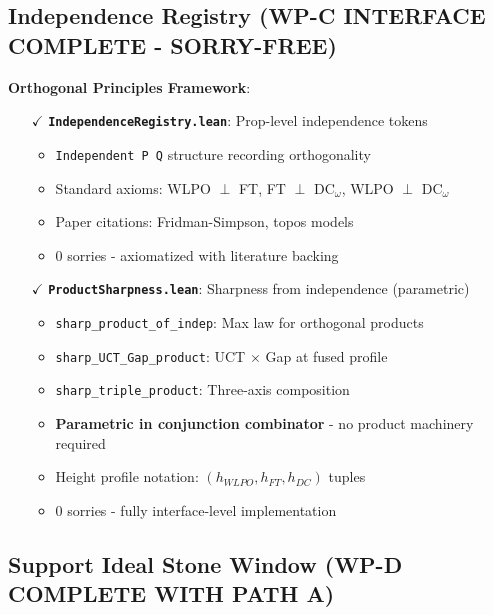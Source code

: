 \documentclass[11pt]{article}
\theoremstyle{definition}
\theoremstyle{remark}
\begin{document}
\subsection{Independence Registry (WP-C INTERFACE COMPLETE - SORRY-FREE)}

\textbf{Orthogonal Principles Framework}:
\begin{itemize}
\item[$\checkmark$] \textbf{\texttt{IndependenceRegistry.lean}}: Prop-level independence tokens
  \begin{itemize}
  \item \texttt{Independent P Q} structure recording orthogonality
  \item Standard axioms: WLPO $\perp$ FT, FT $\perp$ DC$_\omega$, WLPO $\perp$ DC$_\omega$
  \item Paper citations: Fridman-Simpson, topos models
  \item 0 sorries - axiomatized with literature backing
  \end{itemize}
\item[$\checkmark$] \textbf{\texttt{ProductSharpness.lean}}: Sharpness from independence (parametric)
  \begin{itemize}
  \item \texttt{sharp\_product\_of\_indep}: Max law for orthogonal products
  \item \texttt{sharp\_UCT\_Gap\_product}: UCT $\times$ Gap at fused profile
  \item \texttt{sharp\_triple\_product}: Three-axis composition
  \item \textbf{Parametric in conjunction combinator} - no product machinery required
  \item Height profile notation: $(h_{WLPO}, h_{FT}, h_{DC})$ tuples
  \item 0 sorries - fully interface-level implementation
  \end{itemize}
\end{itemize}

\subsection{Support Ideal Stone Window (WP-D COMPLETE WITH PATH A)}
\end{document}
